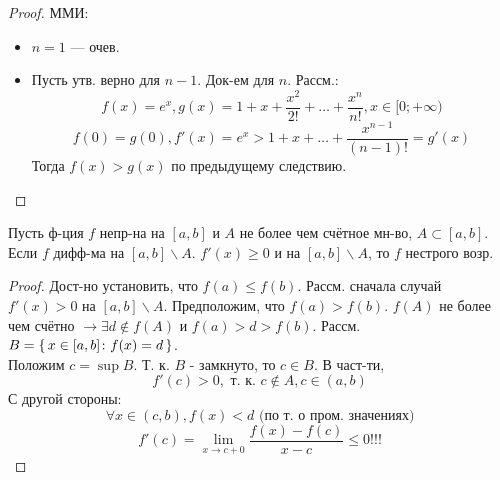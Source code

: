 \begin{proof}
  ММИ:
\begin{itemize}
  \item $n = 1$ --- очев.
  \item Пусть утв. верно для $n - 1$. Док-ем для $n$. Рассм.:
    \[
    f(x) = e^{x}, g(x) = 1 + x + \frac{x^{2}}{2!} + \ldots + \frac{x^{n}}{n!}, x \in [0; +\infty)
    \]
    \[
    f(0) = g(0), f'(x) = e^{x} > 1 + x + \ldots + \frac{x^{n - 1}}{(n - 1)!} = g'(x)
    \]
    Тогда $f(x) > g(x)$ по предыдущему следствию.
\end{itemize}
\end{proof}
\begin{theorem}
Пусть ф-ция $f$ непр-на на $[a, b]$ и $A$ не более чем счётное мн-во, $A \subset [a, b]$. Если $f$ дифф-ма на $[a, b] \backslash A$. $f'(x) \geq 0$ и на $[a, b] \backslash A$, то $f$ нестрого возр.
\end{theorem}
\begin{proof}
Дост-но установить, что $f(a) \leq f(b)$. Рассм. сначала случай $f'(x) > 0$ на $[a, b] \backslash A$. Предположим, что $f(a) > f(b)$. $f(A)$ не более чем счётно $\rightarrow \exists d \not \in f(A)$ и $f(a) > d > f(b)$. Рассм. $B = \set{x \in [a, b] \colon f(x) = d}$. \\
Положим $c = \sup B$. Т. к. $B$ - замкнуто, то $c \in B$. В част-ти,
\[
  f'(c) > 0, \text{ т. к. $c \not \in A, c \in (a, b)$}
\]
С другой стороны:
\[
\forall x \in (c, b), f(x) < d \text{ (по т. о пром. значениях)}
\]
\[
f'(c) = \lim_{x\to c + 0} \frac{f(x) - f(c)}{x - c} \leq 0!!!
\]
\end{proof}
